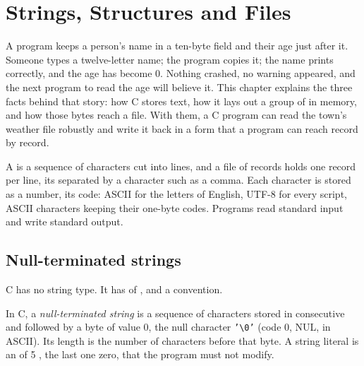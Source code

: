 \chapter{Strings, Structures and Files}\label{ch:b1:c-strings-structs-files}

A program keeps a person's name in a ten-byte field and their age just after it. Someone types a twelve-letter name;
the program copies it; the name prints correctly, and the age has become 0. Nothing crashed, no warning appeared, and
the next program to read the age will believe it. This chapter explains the three facts behind that story: how C
stores text, how it lays out a group of  in memory, and how those bytes reach a file. With them, a C program
can read the town's weather file robustly and write it back in a form that a program can reach record by record.

\begin{recall}
A  is a sequence of characters cut into lines, and a file of records holds one record per line, its 
separated by a character such as a comma. Each character is stored as a number, its code: ASCII for the letters of
English, UTF-8 for every script, ASCII characters keeping their one-byte codes. Programs read standard input and write
standard output.
\end{recall}

\section{Null-terminated strings}\label{sec:b1:c-strings-structs-files:strings}

C has no string type. It has  of , and a convention.

\begin{definition}\label{def:b1:c-strings-structs-files:string}
In C, a \emph{null-terminated string} is a sequence of characters
stored in consecutive  and followed by a byte of value 0, the null character \texttt{'\textbackslash{}0'}
(code 0, NUL, in ASCII). Its length is the number of characters before that byte. A string literal  is an
 of 5 , the last one zero, that the program must not modify.
\end{definition}

